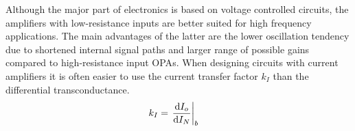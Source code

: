 Although the major part of electronics is based on voltage controlled circuits, the amplifiers with low-resistance inputs are better suited for high frequency applications. The main advantages of the latter are the lower oscillation tendency due to shortened internal signal paths and larger range of possible gains compared to high-resistance input \ac{OPA}s. When designing circuits with current amplifiers it is often easier to use the current transfer factor $k_I$ than the differential transconductance.
\begin{align}
  k_I &= \eval{\dv{I_o}{I_N}}_{b}
\end{align}

\begin{figure}[!htb]
\end{figure}

